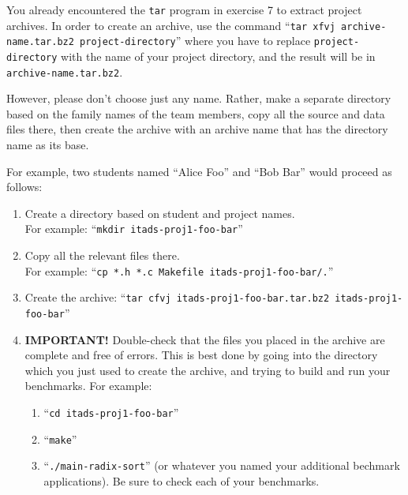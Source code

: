 \documentclass[a4paper,10pt]{article}
\begin{document}
You already encountered the \texttt{tar} program in exercise 7 to extract project archives.
In order to create an archive, use the command ``\texttt{tar xfvj archive-name.tar.bz2 project-directory}'' where you have to replace \texttt{project-directory} with the name of your project directory, and the result will be in \texttt{archive-name.tar.bz2}.

However, please don't choose just any name.
Rather, make a separate directory based on the family names of the team members, copy all the source and data files there, then create the archive with an archive name that has the directory name as its base.

For example, two students named ``Alice Foo'' and ``Bob Bar'' would proceed as follows:
\begin{enumerate}
\item
  Create a directory based on student and project names.\\
  For example: ``\texttt{mkdir itads-proj1-foo-bar}''
\item
  Copy all the relevant files there.\\
  For example: ``\texttt{cp *.h *.c Makefile itads-proj1-foo-bar/.}''
\item
  Create the archive: ``\texttt{tar cfvj itads-proj1-foo-bar.tar.bz2 itads-proj1-foo-bar}''
\item
  \textbf{IMPORTANT!}
  Double-check that the files you placed in the archive are complete and free of errors.
  This is best done by going into the directory which you just used to create the archive, and trying to build and run your benchmarks.
  For example:
  \begin{enumerate}
  \item
    ``\texttt{cd itads-proj1-foo-bar}''
  \item
    ``\texttt{make}''
  \item
    ``\texttt{./main-radix-sort}'' (or whatever you named your additional bechmark applications).
    Be sure to check each of your benchmarks.
  \end{enumerate}
\end{enumerate}



\footnotesize


\end{document}
